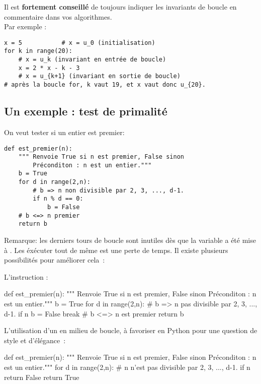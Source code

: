 Il est \textbf{fortement conseillé} de toujours indiquer les invariants de boucle en commentaire 
dans vos algorithmes.\\ 

Par exemple :


\begin{lstlisting}
x = 5			# x = u_0 (initialisation)
for k in range(20): 	
    # x = u_k (invariant en entrée de boucle)
    x = 2 * x - k - 3	
    # x = u_{k+1} (invariant en sortie de boucle)	
# après la boucle for, k vaut 19, et x vaut donc u_{20}.
\end{lstlisting}
  


\subsection{Un exemple : test de primalité} 

  On veut tester si un entier  est premier:
\begin{lstlisting}
def est_premier(n):
    """ Renvoie True si n est premier, False sinon
        Préconditon : n est un entier."""
    b = True
    for d in range(2,n):
        # b => n non divisible par 2, 3, ..., d-1.
        if n % d == 0:
            b = False
    # b <=> n premier
    return b
\end{lstlisting}

Remarque: les derniers tours de boucle sont inutiles dès que la
variable  a été mise à . Les éxécuter tout de même est une perte de temps. Il 
existe plusieurs possibilités pour améliorer cela~:

L'instruction  :
\begin{pyverbatim}
def est_premier(n):
    """ Renvoie True si n est premier, False sinon
        Préconditon : n est un entier."""
    b = True
    for d in range(2,n):
        # b => n pas divisible par 2, 3, ..., d-1.
        if n %
            b = False
            break
    # b <=> n est premier
    return b
\end{pyverbatim}

L'utilisation d'un  en milieu de boucle, à favoriser en Python{} pour 
une question de style et d'élégance~:

\begin{pyverbatim}
def est_premier(n):
    """ Renvoie True si n est premier, False sinon
        Préconditon : n est un entier."""
    for d in range(2,n):
        # n n'est pas divisible par 2, 3, ..., d-1.
        if n %
            return False
    return True
\end{pyverbatim}

